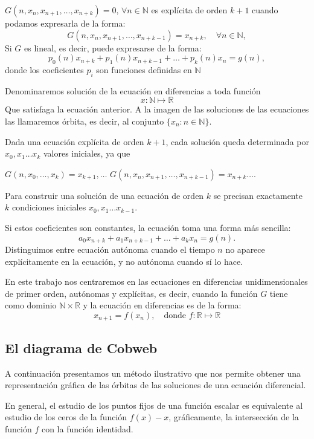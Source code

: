 \documentclass[12pt,a4paper]{report}
\theoremstyle{definition}
\begin{document}
$G(n, x_n,x_{n+1}, \ldots, x_{n+k}) = 0, \, \forall n \in \mathbb{N}$ es explícita de orden $k+1$ cuando podamos expresarla de la forma: 
\[
G(n, x_n,x_{n+1}, \ldots, x_{n+k-1}) = x_{n+k}, \quad \forall n \in \mathbb{N},
\]
%
Si $G$ es lineal, es decir, puede expresarse de la forma:
\[
p_0(n)x_{n+k} + p_1(n)x_{n+k-1} + \dots + p_k(n)x_{n} = g(n),
\]
donde los coeficientes \( p_i \) son funciones definidas en \( \mathbb{N} \)

Denominaremos solución de la ecuación en diferencias a toda función 
$$
x : \mathbb{N} \mapsto \mathbb{R}
$$ 
Que satisfaga la ecuación anterior.
A la imagen de las soluciones de las ecuaciones las llamaremos órbita, es decir, al conjunto $\{x_n\colon n\in\mathbb{N} \}$. 

Dada una ecuación explícita de orden $k+1$, cada solución queda determinada por $x_0, x_1 \ldots x_{k}$ valores iniciales, ya que 

$G(n,x_{0}, \ldots, x_{k}) = x_{k + 1}, \ldots$  
$ G(n, x_n,x_{n+1}, \ldots, x_{n+k-1}) = x_{n+k} \ldots$.

Para construir una solución de una ecuación de orden $k$ se precisan exactamente $k$ condiciones iniciales $x_0, x_1 \ldots x_{k-1}$. 

Si estos coeficientes son constantes, la ecuación toma una forma más sencilla:
\[
a_0x_{n+k} + a_1x_{n+k-1} + \dots + a_kx_{n} = g(n).
\]
%
Distinguimos entre ecuación autónoma cuando el tiempo $n$ no aparece explícitamente en la ecuación, y no autónoma cuando sí lo hace.

En este trabajo nos centraremos en las ecuaciones en diferencias unidimensionales de primer orden, autónomas y explícitas, es decir, cuando la función $G$ tiene como dominio $\mathbb{N} \times \mathbb{R}$ y la ecuación en diferencias es de la forma:
\[x_{n+1} = f(x_n),\quad \text{donde } f : \mathbb{R} \mapsto  \mathbb{R} \]

\subsection{El diagrama de Cobweb}

A continuación presentamos un método ilustrativo que nos permite obtener una representación gráfica de las órbitas de las soluciones de una ecuación diferencial.

En general, el estudio de los puntos fijos de una función escalar es equivalente al estudio de los ceros de la función $f(x) - x $, gráficamente, la intersección de la función $f$ con la función identidad.
\end{document}
